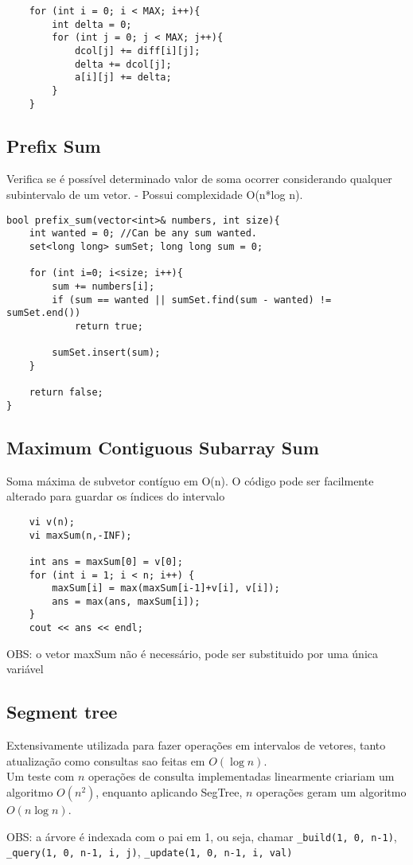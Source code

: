 \begin{verbatim}
    for (int i = 0; i < MAX; i++){
        int delta = 0;
        for (int j = 0; j < MAX; j++){
            dcol[j] += diff[i][j];
            delta += dcol[j];
            a[i][j] += delta;
        }
    }
\end{verbatim}

\subsection{Prefix Sum}
    Verifica se é possível determinado valor de soma ocorrer considerando qualquer subintervalo de um vetor.
    - Possui complexidade O(n*log n).

\begin{verbatim}
bool prefix_sum(vector<int>& numbers, int size){
    int wanted = 0; //Can be any sum wanted.
    set<long long> sumSet; long long sum = 0; 

    for (int i=0; i<size; i++){
        sum += numbers[i];
        if (sum == wanted || sumSet.find(sum - wanted) != sumSet.end())
            return true;

        sumSet.insert(sum);
    }
    
    return false;
}
\end{verbatim}

\subsection{Maximum Contiguous Subarray Sum}

Soma máxima de subvetor contíguo em O(n). O código pode ser facilmente alterado para guardar os índices do intervalo

\begin{verbatim}
    vi v(n);
    vi maxSum(n,-INF);

    int ans = maxSum[0] = v[0];
    for (int i = 1; i < n; i++) {
        maxSum[i] = max(maxSum[i-1]+v[i], v[i]);
        ans = max(ans, maxSum[i]);
    }
    cout << ans << endl;

\end{verbatim}
OBS: o vetor maxSum não é necessário, pode ser substituido por uma única variável


\subsection{Segment tree}
\par Extensivamente utilizada para fazer operações em intervalos de vetores, tanto atualização como consultas sao feitas em $O(\log n)$. \\
Um teste com $n$ operações de consulta implementadas linearmente criariam um algoritmo $O(n^2)$, enquanto aplicando SegTree, $n$ operações geram um algoritmo $O(n\log n)$.
\par OBS: a árvore é indexada com o pai em 1, ou seja, chamar \lstinline{_build(1, 0, n-1)}, \lstinline{_query(1, 0, n-1, i, j)}, \lstinline{_update(1, 0, n-1, i, val)}


